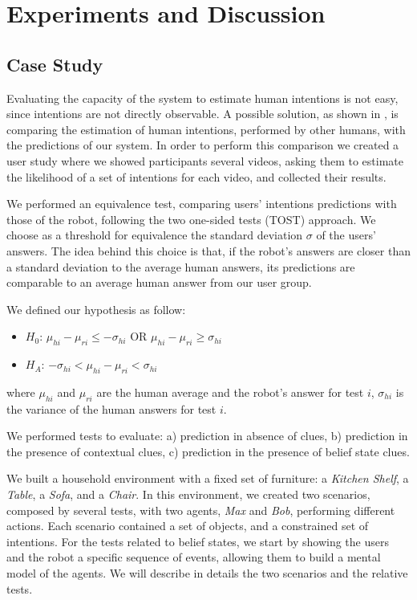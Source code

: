 \section{Experiments and Discussion}
\label{sec:situation_assessment-experiments}
\subsection{Case Study}
Evaluating the capacity of the system to estimate human intentions is not easy, since intentions are not directly observable. A possible solution, as shown in \cite{baker2014modeling}, is comparing the estimation of human intentions, performed by other humans, with the predictions of our system. In order to perform this comparison we created a user study where we showed participants several videos, asking them to estimate the likelihood of a set of intentions for each video, and collected their results. 

We performed an equivalence test, comparing users' intentions predictions with those of the robot, following the two one-sided tests (TOST) approach. We choose as a threshold for equivalence the standard deviation $\sigma$ of the users' answers. The idea behind this choice is that, if the robot's answers are closer than a standard deviation to the average human answers, its predictions are comparable to an average human answer from our user group. 

We defined our hypothesis as follow: 
\begin{itemize}
\item $H_0$: $\mu_{hi}-\mu_{ri}\leq-\sigma_{hi}$ OR $\mu_{hi}-\mu_{ri}\geq\sigma_{hi}$ 
\item $H_A$: $-\sigma_{hi}<\mu_{hi}-\mu_{ri}<\sigma_{hi}$  
\end{itemize}
where $\mu_{hi}$ and $\mu_{ri}$ are the human average and the robot's answer for test $i$, $\sigma_{hi}$ is the variance of the human answers for test $i$.

We performed tests to evaluate: a) prediction in absence of clues, b) prediction in the presence of contextual clues, c) prediction in the presence of belief state clues.

We built a household environment with a fixed set of furniture: a \textit{Kitchen Shelf}, a \textit{Table}, a \textit{Sofa}, and a \textit{Chair}. In this environment, we created two scenarios, composed by several tests, with two agents, \textit{Max} and \textit{Bob}, performing different actions. Each scenario contained a set of objects, and a constrained set of intentions. For the tests related to belief states, we start by showing the users and the robot a specific sequence of events, allowing them to build a mental model of the agents. We will describe in details the two scenarios and the relative tests.

